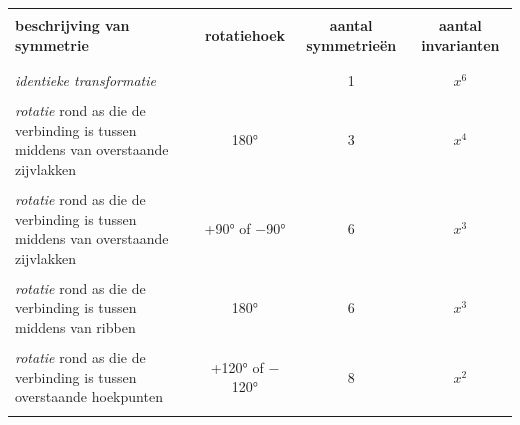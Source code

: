 \begin{center}
    \begin{tabular}{ |p{6 cm} |c |c|c|}
    \hline
    &&&\\
    \bf{beschrijving van symmetrie} & \bf{rotatiehoek} & \bf{aantal symmetrieën} & \bf{aantal invarianten} \\ 
    &&&\\
    \hline
    &&&\\
   \emph{identieke transformatie} & & 1 & $x^6$ \\ 
   &&&\\
   \emph{rotatie} rond as die de verbinding is tussen middens van overstaande zijvlakken & 180° & 3 & $x^4$ \\ 
   &&&\\
   \emph{rotatie }rond as die de verbinding is tussen middens van overstaande zijvlakken & +90° of $-$90° & 6 & $x^3$ \\
   &&&\\
   \emph{rotatie} rond as die de verbinding is tussen middens van ribben & 180° & 6 & $x^3$ \\ 
   &&&\\
   \emph{rotatie} rond as die de verbinding is tussen overstaande hoekpunten & +120° of $-$120° & 8& $x^2$ \\
    &&&\\
    \hline
    \end{tabular}
\end{center}
\vspace{0.5cm}
